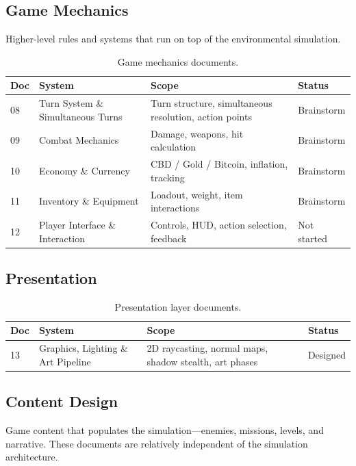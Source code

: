 \documentclass[11pt,a4paper]{article}
\begin{document}
\subsection{Game Mechanics}

Higher-level rules and systems that run on top of the environmental
simulation.

\begin{table}[h]
\centering
\begin{tabular}{@{}llp{5.5cm}l@{}}
\toprule
\textbf{Doc} & \textbf{System} & \textbf{Scope} & \textbf{Status} \\
\midrule
08 & Turn System \& Simultaneous Turns & Turn structure, simultaneous resolution, action points & Brainstorm \\
09 & Combat Mechanics & Damage, weapons, hit calculation & Brainstorm \\
10 & Economy \& Currency & CBD / Gold / Bitcoin, inflation, tracking & Brainstorm \\
11 & Inventory \& Equipment & Loadout, weight, item interactions & Brainstorm \\
12 & Player Interface \& Interaction & Controls, HUD, action selection, feedback & Not started \\
\bottomrule
\end{tabular}
\caption{Game mechanics documents.}
\label{tab:game-systems}
\end{table}

\subsection{Presentation}

\begin{table}[h]
\centering
\begin{tabular}{@{}llp{5.5cm}l@{}}
\toprule
\textbf{Doc} & \textbf{System} & \textbf{Scope} & \textbf{Status} \\
\midrule
13 & Graphics, Lighting \& Art Pipeline & 2D raycasting, normal maps, shadow stealth, art phases & Designed \\
\bottomrule
\end{tabular}
\caption{Presentation layer documents.}
\label{tab:presentation}
\end{table}

\subsection{Content Design}

Game content that populates the simulation---enemies, missions, levels,
and narrative.  These documents are relatively independent of the
simulation architecture.
\end{document}
